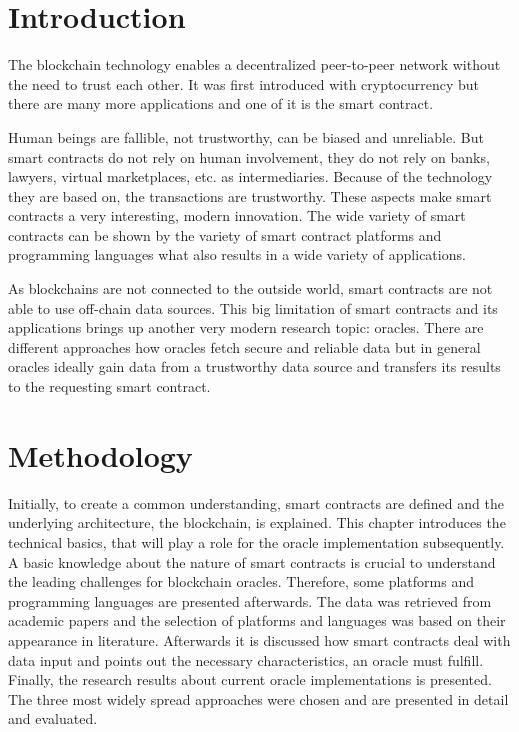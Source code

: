 \documentclass[conference]{IEEEtran}
\begin{document}




%
\IEEEpeerreviewmaketitle



\section{Introduction}
The blockchain technology enables a decentralized peer-to-peer network without the need to trust each other. It was first introduced with cryptocurrency but there are many more applications and one of it is the smart contract. \cite{Buterin2014} \par 
Human beings are fallible, not trustworthy, can be biased and unreliable. But smart contracts do not rely on human involvement, they do not rely on banks, lawyers, virtual marketplaces, etc. as intermediaries. Because of the technology they are based on, the transactions are trustworthy. \cite{Mik2017} \cite{Meitinger2017} These aspects make smart contracts a very interesting, modern innovation. The wide variety of smart contracts can be shown by the variety of smart contract platforms and programming languages what also results in a wide variety of applications. \par
As blockchains are not connected to the outside world, smart contracts are not able to use off-chain data sources. This big limitation of smart contracts and its applications brings up another very modern research topic: oracles. There are different approaches how oracles fetch secure and reliable data but in general oracles ideally gain data from a trustworthy data source and transfers its results to the requesting smart contract. \cite{Mik2017} \cite{Ellis2017} 




\section{Methodology}
Initially, to create a common understanding, smart contracts are defined and the underlying architecture, the blockchain, is explained. This chapter introduces the technical basics, that will play a role for the oracle implementation subsequently. A basic knowledge about the nature of smart contracts is crucial to understand the leading challenges for blockchain oracles. Therefore, some platforms and programming languages are presented afterwards. The data was retrieved from academic papers and the selection of platforms and languages was based on their appearance in literature. Afterwards it is discussed how smart contracts deal with data input and points out the necessary characteristics, an oracle must fulfill. Finally, the research results about current oracle implementations is presented. The three most widely spread approaches were chosen and are presented in detail and evaluated.
\end{document}
